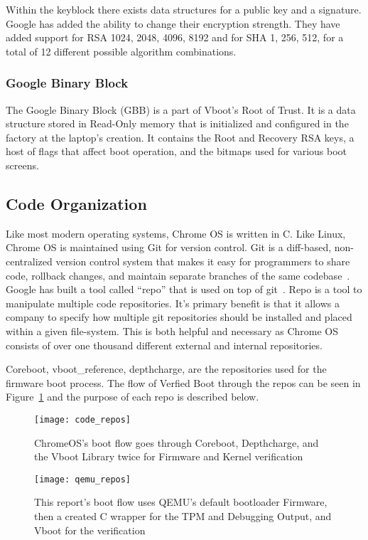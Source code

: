 \documentclass[../report.tex]{subfiles}
\begin{document}
Within the keyblock there exists data structures for a public key and a signature.
Google has added the ability to change their encryption strength.
They have added support for RSA 1024, 2048, 4096, 8192 and for SHA 1, 256, 512, for a total of 12 different possible algorithm combinations.

\subsubsection{Google Binary Block}

The Google Binary Block (GBB) is a part of Vboot's Root of Trust.
It is a data structure stored in Read-Only memory that is initialized and configured in the factory at the laptop's creation.
It contains the Root and Recovery RSA keys, a host of flags that affect boot operation, and the bitmaps used for various boot screens.


\subsection{Code Organization}

Like most modern operating systems, Chrome OS is written in C.
Like Linux, Chrome OS is maintained using Git for version control. 
Git is a diff-based, non-centralized version control system that makes it easy for programmers to share code, rollback changes, and maintain separate branches of the same codebase~\cite{git}.
Google has built a tool called ``repo'' that is used on top of git~\cite{repo}. 
Repo is a tool to manipulate multiple code repositories. 
It's primary benefit is that it allows a company to specify how multiple git repositories should be installed and placed within a given file-system.
This is both helpful and necessary as Chrome OS consists of over one thousand different external and internal repositories. 

Coreboot, vboot\_reference, depthcharge, are the repositories used for the firmware boot process.
The flow of Verfied Boot through the repos can be seen in
Figure~\ref{fig:code_repos} and the purpose of each repo is described below.

\begin{figure}
  \centering
  \texttt{[image: code\_repos]}
  \caption{ChromeOS's boot flow goes through Coreboot, Depthcharge, and the Vboot Library twice for Firmware and Kernel verification}\label{fig:code_repos}
\end{figure}
\begin{figure}
  \centering
  \texttt{[image: qemu\_repos]}
  \caption{This report's boot flow uses QEMU's default bootloader Firmware, then
  a created C wrapper for the TPM and Debugging Output, and Vboot for the
  verification}\label{fig:qemu_repos}
\end{figure}
\end{document}
